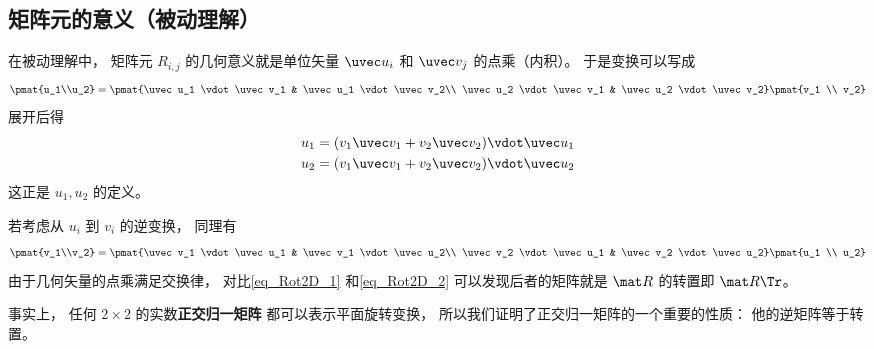 \subsection{矩阵元的意义（被动理解）}
在被动理解中， 矩阵元 $R_{i,j}$ 的几何意义就是单位矢量 $\uvec u_i$ 和 $\uvec v_j$ 的点乘（内积）。 于是变换可以写成
\begin{equation}\label{eq_Rot2D_1}
\pmat{u_1\\u_2} = \pmat{\uvec u_1 \vdot \uvec v_1 & \uvec u_1 \vdot \uvec v_2\\ \uvec u_2 \vdot \uvec v_1 & \uvec u_2 \vdot \uvec v_2} \pmat{v_1 \\ v_2}
\end{equation}
展开后得
\begin{equation}
\begin{aligned}
&u_1 = (v_1 \uvec v_1 + v_2 \uvec v_2) \vdot \uvec u_1\\
&u_2 = (v_1 \uvec v_1 + v_2 \uvec v_2) \vdot \uvec u_2
\end{aligned}
\end{equation}
这正是 $u_1, u_2$ 的定义。

若考虑从 $u_i$ 到 $v_i$ 的逆变换， 同理有
\begin{equation}\label{eq_Rot2D_2}
\pmat{v_1\\v_2} = \pmat{\uvec v_1 \vdot \uvec u_1 & \uvec v_1 \vdot \uvec u_2\\ \uvec v_2 \vdot \uvec u_1 & \uvec v_2 \vdot \uvec u_2} \pmat{u_1 \\ u_2}
\end{equation}
由于几何矢量的点乘满足交换律， 对比\autoref{eq_Rot2D_1} 和\autoref{eq_Rot2D_2} 可以发现后者的矩阵就是 $\mat R$ 的转置即 $\mat R\Tr$。

事实上， 任何 $2\times2$ 的实数\textbf{正交归一矩阵} 都可以表示平面旋转变换， 所以我们证明了正交归一矩阵的一个重要的性质： 他的逆矩阵等于转置。
